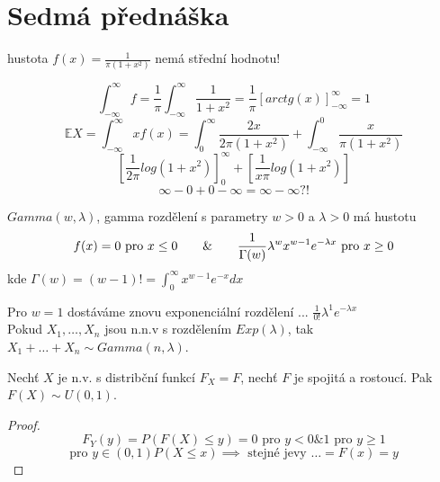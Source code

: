 \documentclass[../main.tex]{subfiles}
\begin{document}
\section{Sedmá přednáška}


\begin{definition}

    hustota $f(x) = \frac{1}{\pi (1+x^2)}$
    nemá střední hodnotu!

    \begin{remark}
        \[\int^\infty_{-\infty} f = \frac{1}{\pi} \int^\infty_{-\infty} \frac{1}{1+x^2} = \frac{1}{\pi}\left[arctg(x)\right]^\infty_{-\infty} = 1\]
        \[\mathbb{E}X = \int^\infty_{-\infty} x f(x) = \int^\infty_0 \frac{2x}{2\pi (1+x^2)} + \int^0_{-\infty}\frac{x}{\pi (1+x^2)}\]
        \[\left[\frac{1}{2\pi}log(1+x^2)\right]^\infty_0 + \left[\frac{1}{x\pi} log(1+x^2)\right]\]
        \[\infty - 0 + 0- \infty = \infty - \infty ?!\]
    \end{remark}
    
\end{definition}

\begin{definition} 

    $Gamma(w,\lambda)$, gamma rozdělení s parametry $w > 0$ a $\lambda > 0$ má hustotu
    \[f(x) = 0 \text{ pro } x \leq 0 \hspace{7mm} \& \hspace{7mm} \frac{1}{\Gamma(w)}\lambda^w x^{w-1} e^{-\lambda x} \text{ pro } x\geq 0\]
    kde $\Gamma(w) = (w-1)! = \int^\infty_0 x^{w-1}e^{-x}dx$

    Pro $w = 1$ dostáváme znovu exponenciální rozdělení ... $\frac{1}{0!}\lambda^1 e^{-\lambda x}$\\
    Pokud $X_1,\dots ,X_n$ jsou n.n.v s rozdělením $Exp(\lambda)$, tak $X_1 + \dots + X_n \sim Gamma(n, \lambda)$.  
\end{definition}
\begin{theorem}
    Nechť $X$ je n.v. s distribční funkcí $F_X = F$, nechť $F$ je spojitá a rostoucí. Pak $F(X) \sim U(0,1)$.\\
\end{theorem}
\begin{proof}
    \[F_Y(y) = P(F(X) \leq y) = 0 \text{ pro } y < 0 \& 1 \text{ pro } y \geq 1\]
    \[\text{pro } y \in (0,1) P(X \leq x) \implies \text{ stejné jevy } \dots = F(x) = y\]
\end{proof}
\end{document}
